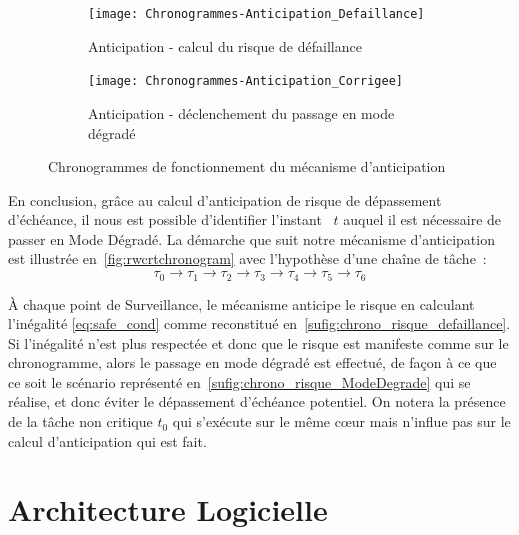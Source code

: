 \documentclass[french, a4paper, 11pt, twoside, pdftex]{StyleThese}
\begin{document}
	\begin{figure}[ht]
		\centering
		\begin{subfigure}{0.7\textwidth} \centering
			\texttt{[image: Chronogrammes-Anticipation\_Defaillance]}
			\caption[Anticipation - risque de défaillance]{Anticipation - calcul du risque de défaillance}
			\label{sufig:chrono_risque_defaillance}
		\end{subfigure}
		\begin{subfigure}{0.7\textwidth} \centering
			\texttt{[image: Chronogrammes-Anticipation\_Corrigee]}
			\caption[Anticipation - passage en mode dégradé]{Anticipation - déclenchement du passage en mode dégradé}
			\label{sufig:chrono_risque_ModeDegrade}
		\end{subfigure}
		\caption{Chronogrammes de fonctionnement du mécanisme d'anticipation}
		\label{fig:rwcrtchronogram}
	\end{figure}

    En conclusion, grâce au calcul d'anticipation de risque de dépassement d'échéance, il nous est possible d'identifier l'instant ~$t$ auquel il est nécessaire de passer en Mode Dégradé. La démarche que suit notre mécanisme d'anticipation est illustrée en~\autoref{fig:rwcrtchronogram} avec l'hypothèse d'une chaîne de tâche~:    \[ \tau_{0} \rightarrow \tau_{1} \rightarrow \tau_{2} \rightarrow \tau_{3} \rightarrow \tau_{4} \rightarrow \tau_{5} \rightarrow \tau_{6} \] 
     
     À chaque point de Surveillance, le mécanisme anticipe le risque en calculant l'inégalité \ref{eq:safe_cond} comme reconstitué en~\autoref{sufig:chrono_risque_defaillance}. Si l'inégalité n'est plus respectée et donc que le risque est manifeste comme sur le chronogramme, alors le passage en mode dégradé est effectué, de façon à ce que ce soit le scénario représenté en~\autoref{sufig:chrono_risque_ModeDegrade} qui se réalise, et donc éviter le dépassement d'échéance potentiel. On notera la présence de la tâche non critique $t_0$ qui s'exécute sur le même cœur mais n'influe pas sur le calcul d'anticipation qui est fait.
	
	\section{Architecture Logicielle}
	
\end{document}
